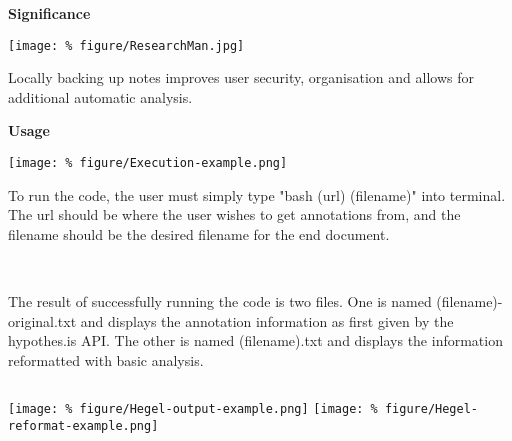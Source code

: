 \documentclass[unknownkeysallowed,usepdftitle=false, parskip=full]{beamer}
\newcommand{\secvariable}{nothing}
\newcommand{\mysection}[1]{\renewcommand{\secvariable}{#1}
}
\begin{document}
\mysection{major}
\begin{frame}\label{\secvariable} %
\parbox{\linewidth}{\textbf{Significance}}
\begin{center}
\texttt{[image: \%
figure/ResearchMan.jpg]}
\end{center}

    \parbox{\linewidth}{

Locally backing up notes improves user security, organisation and allows for additional automatic analysis.
}
\end{frame}

\mysection{slab}
\begin{frame}\label{\secvariable}
\begin{center}
 \parbox{\linewidth}{ \textbf{Usage}}
\texttt{[image: \%
figure/Execution-example.png]}
\end{center}
    \parbox{\linewidth}{

To run the code, the user must simply type "bash (url) (filename)" into terminal. The url should be where the user wishes to get annotations from, and the filename should be the desired filename for the end document. \hyperlink{slabtable}{}
}

\end{frame}



\begin{frame}\label{slabtable}
\begin{columns}
\begin{column}[t]{1.1\textwidth}
\hyperlink{slab}{}\\
The result of successfully running the code is two files. One is named (filename)-original.txt and displays the annotation information as first given by the hypothes.is API. The other is named (filename).txt and displays the information reformatted with basic analysis.



\vspace{0.3cm}
\end{column}
\end{columns}
%
\texttt{[image: \%
figure/Hegel-output-example.png]}\hspace{.05\textwidth}
\texttt{[image: \%
figure/Hegel-reformat-example.png]}
 
\vspace{0.2cm}

\end{frame}
\end{document}
